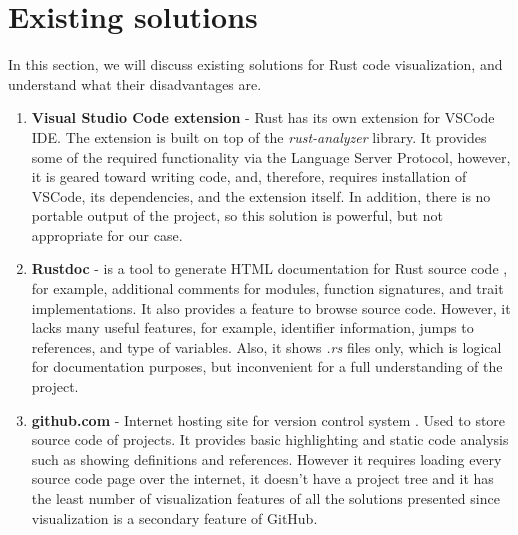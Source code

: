 \section{Existing solutions}
\label{sec:sol}

In this section, we will discuss existing solutions for Rust code visualization, and understand what their disadvantages are.

\begin{enumerate}[label=\arabic*)]
    \item \textbf{Visual Studio Code extension} - Rust has its own extension for VSCode IDE. The extension is built on top of the \textit{rust-analyzer} \cite{crates-rust-analyzer} library. It provides some of the required functionality via the Language Server Protocol, however, it is geared toward writing code, and, therefore, requires installation of VSCode, its dependencies, and the extension itself. In addition, there is no portable output of the project, so this solution is powerful, but not appropriate for our case.

    \item \textbf{Rustdoc} - is a tool to generate HTML documentation for Rust source code \cite{rustdoc}, for example, additional comments for modules, function signatures, and trait implementations. It also provides a feature to browse source code. However, it lacks many useful features, for example, identifier information, jumps to references, and type of variables. Also, it shows \textit{.rs} files only, which is logical for documentation purposes, but inconvenient for a full understanding of the project.

    \item \textbf{github.com} - Internet hosting site for version control system \cite{github}. Used to store source code of projects. It provides basic highlighting and static code analysis such as showing definitions and references. However it requires loading every source code page over the internet, it doesn't have a project tree and it has the least number of visualization features of all the solutions presented since visualization is a secondary feature of GitHub.
\end{enumerate}




